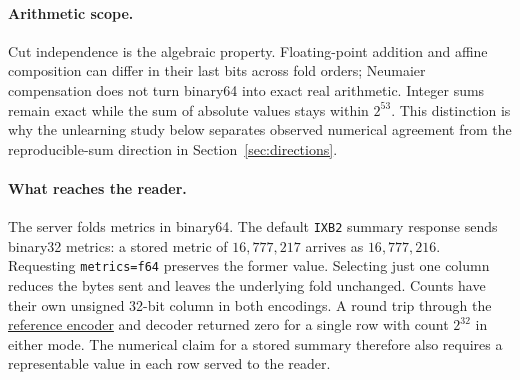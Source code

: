 \documentclass[11pt]{article}
\begin{document}
\paragraph{Arithmetic scope.}
Cut independence is the algebraic property. Floating-point addition and affine composition can differ in their last bits across fold orders; Neumaier compensation does not turn binary64 into exact real arithmetic. Integer sums remain exact while the sum of absolute values stays within $2^{53}$. This distinction is why the unlearning study below separates observed numerical agreement from the reproducible-sum direction in Section~\ref{sec:directions}.

\paragraph{What reaches the reader.}
The server folds metrics in binary64. The default \texttt{IXB2} summary response sends binary32 metrics: a stored metric of $16{,}777{,}217$ arrives as $16{,}777{,}216$. Requesting \texttt{metrics=f64} preserves the former value. Selecting just one column reduces the bytes sent and leaves the underlying fold unchanged. Counts have their own unsigned 32-bit column in both encodings. A round trip through the \href{https://github.com/indexus/core/blob/5188b61/internal/wire/sets_block.go}{reference encoder} and decoder returned zero for a single row with count $2^{32}$ in either mode. The numerical claim for a stored summary therefore also requires a representable value in each row served to the reader.
\end{document}
